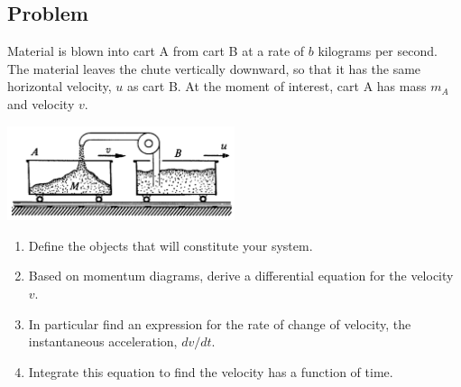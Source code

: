 \documentclass[solutions]{esg8012pset}
\begin{document}
\subsection{Problem}
  Material is blown into cart A from cart B at a rate of $b$ kilograms per second. The material leaves the chute vertically downward, so that it has the same horizontal velocity, $u$ as cart B. At the moment of interest, cart A has mass $m_A$ and velocity $v$.
  \begin{center}\includegraphics[width=0.5\textwidth]{ps_04_2}\end{center}
  \begin{enumerate}
    \item Define the objects that will constitute your system.
    \item Based on momentum diagrams, derive a differential equation for the velocity $v$.
    \item In particular find an expression for the rate of change of velocity, the instantaneous acceleration, $d v / d t$.
    \item Integrate this equation to find the velocity has a function of time.
  \end{enumerate}
\end{document}
